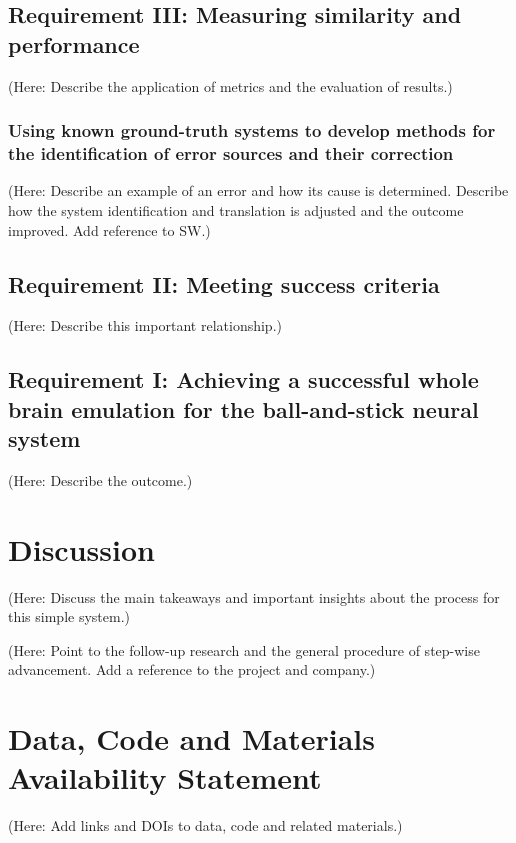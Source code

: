 \documentclass{ldr-article}
\begin{document}
\subsection{Requirement III: Measuring similarity and performance}

(Here: Describe the application of metrics and the evaluation of results.)

\subsubsection{Using known ground-truth systems to develop methods for the identification of error sources and their correction}

(Here: Describe an example of an error and how its cause is determined. Describe how the system identification and translation is adjusted and the outcome improved. Add reference to SW.)

\subsection{Requirement II: Meeting success criteria}

(Here: Describe this important relationship.)

\subsection{Requirement I: Achieving a successful whole brain emulation for the ball-and-stick neural system}

(Here: Describe the outcome.)

\section{Discussion}

(Here: Discuss the main takeaways and important insights about the process for this simple system.)

(Here: Point to the follow-up research and the general procedure of step-wise advancement. Add a reference to the project and company.)

\printbibliography

\section{Data, Code and Materials Availability Statement}

(Here: Add links and DOIs to data, code and related materials.)
\end{document}
